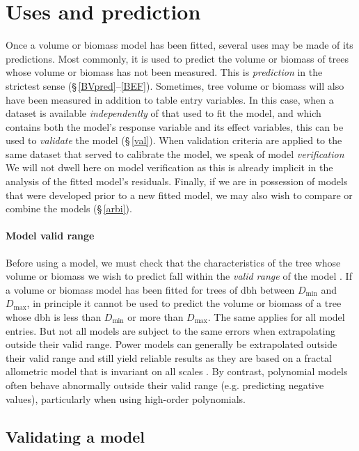 \chapter{Uses and prediction\label{util}}

Once a volume or biomass model has been fitted, several uses may be made of its predictions. Most commonly, it is used to predict the volume or biomass of trees whose volume or biomass has not been measured. This is \emph{prediction} in the strictest sense 
(\S\,\ref{BVpred}--\ref{BEF}). Sometimes, tree volume or biomass will also have been measured in addition to table entry variables. In this case, when a dataset is available \emph{independently} of that used to fit the model, and which contains both the model's response variable and its effect variables, this can be used to 
\emph{validate} the model (\S\,\ref{val}). When validation criteria are applied to the same dataset that served to calibrate the model, we speak of model \emph{verification} We will not dwell here on model verification as this is already implicit in the analysis of the fitted model's residuals. Finally, if we are in possession of models that were developed prior to a new fitted model, we may also wish to compare or combine the models (\S\,\ref{arbi}).

\subsubsection{Model valid range}

Before using a model, we must check that the characteristics of the tree whose volume or biomass we wish to predict fall within the \emph{valid range} of the model \citep{rykiel96}. If a volume or biomass model has been fitted for trees of dbh between $D_{\min}$ and $D_{\max}$, in principle it cannot be used to predict the volume or biomass of a tree whose dbh is less than $D_{\min}$ or more than $D_{\max}$. The same applies for all model entries. But not all models are subject to the same errors when extrapolating outside their valid range. Power models can generally be extrapolated outside their valid range and still yield reliable results as they are based on a fractal allometric model that is invariant on all scales \citep{zianis04}. By contrast, polynomial models often behave abnormally outside their valid range (e.g. predicting negative values), particularly when using high-order polynomials.

\section{Validating a model\label{val}}

